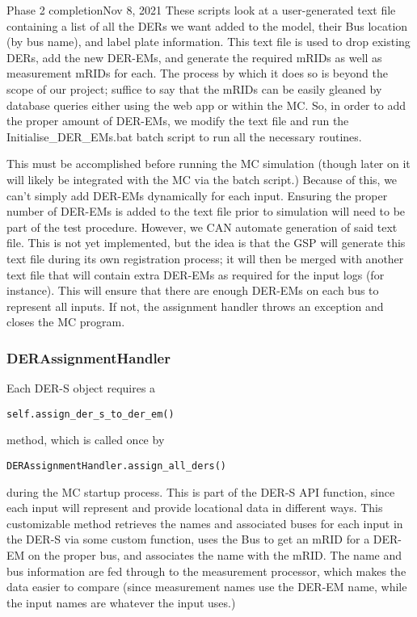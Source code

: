 \begin{entry}{Phase 2 completion}{Nov 8, 2021}
    These scripts look at a user-generated text file containing a list of all the DERs we want added to the model, 
    their Bus location (by bus name), and label plate information. This text file is used to drop existing DERs, add
    the new DER-EMs, and generate the required mRIDs as well as measurement mRIDs for each. The process by which it 
    does so is beyond the scope of our project; suffice to say that the mRIDs can be easily gleaned by database queries
    either using the web app or within the MC. So, in order to add the proper amount of DER-EMs, we modify the text file
    and run the Initialise_DER_EMs.bat batch script to run all the necessary routines.
    
    This must be accomplished before running the MC simulation (though later on it will likely be integrated with the MC
    via the batch script.) Because of this, we can't simply add DER-EMs dynamically for each input. Ensuring the proper
    number of DER-EMs is added to the text file prior to simulation will need to be part of the test procedure. 
    However, we CAN automate generation of said text file. This is not yet implemented, but the idea is that the GSP
    will generate this text file during its own registration process; it will then be merged with another text file that
    will contain extra DER-EMs as required for the input logs (for instance). This will ensure that there are enough
    DER-EMs on each bus to represent all inputs. If not, the assignment handler throws an exception and closes the
    MC program.
    
    \subsubsection*{DERAssignmentHandler}
    Each DER-S object requires a \begin{verbatim}self.assign_der_s_to_der_em()\end{verbatim} method, which is called
    once by \begin{verbatim}DERAssignmentHandler.assign_all_ders()\end{verbatim} during the MC startup process. This is
    part of the DER-S API function, since each input will represent and provide locational data in different ways. This
    customizable method retrieves the names and associated buses for each input in the DER-S via some custom function,
    uses the Bus to get an mRID for a DER-EM on the proper bus, and associates the name with the mRID. The name and bus
    information are fed through to the measurement processor, which makes the data easier to compare (since measurement
    names use the DER-EM name, while the input names are whatever the input uses.)


\end{entry}
